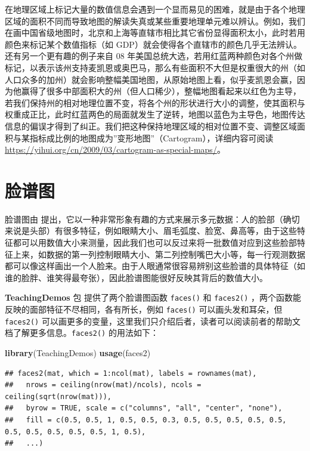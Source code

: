 \documentclass[
  b5paper,
  UTF8,twoside]{book}
\newenvironment{Shaded}{\begin{snugshade}}{\end{snugshade}}
\newcommand{\FunctionTok}[1]{\textcolor[rgb]{0.13,0.29,0.53}{\textbf{#1}}}
\newcommand{\NormalTok}[1]{#1}
\newcounter{none} %
\begin{document}
在地理区域上标记大量的数值信息会遇到一个显而易见的困难，就是由于各个地理区域的面积不同而导致地图的解读失真或某些重要地理单元难以辨认。例如，我们在画中国省级地图时，北京和上海等直辖市相比其它省份显得面积太小，此时若用颜色来标记某个数值指标（如 GDP）就会使得各个直辖市的颜色几乎无法辨认。还有另一个更有趣的例子来自 08 年美国总统大选，若用红蓝两种颜色对各个州做标记，以表示该州支持麦凯恩或奥巴马，那么有些面积不大但是权重很大的州（如人口众多的加州）就会影响整幅美国地图，从原始地图上看，似乎麦凯恩会赢，因为他赢得了很多中部面积大的州（但人口稀少），整幅地图看起来以红色为主导，若我们保持州的相对地理位置不变，将各个州的形状进行大小的调整，使其面积与权重成正比，此时红蓝两色的局面就发生了逆转，地图以蓝色为主导色，地图传达信息的偏误才得到了纠正。我们把这种保持地理区域的相对位置不变、调整区域面积与某指标成比例的地图成为''变形地图''（Cartogram），详细内容可阅读 \url{https://yihui.org/cn/2009/03/cartogram-as-special-maps/}。

\section{脸谱图}\label{sec:faces}

脸谱图由 \citet{Chernoff73} 提出，它以一种非常形象有趣的方式来展示多元数据：人的脸部（确切来说是头部）有很多特征，例如眼睛大小、眉毛弧度、脸宽、鼻高等，由于这些特征都可以用数值大小来测量，因此我们也可以反过来将一批数值对应到这些脸部特征上来，如数据的第一列控制眼睛大小、第二列控制嘴巴大小等，每一行观测数据都可以像这样画出一个人脸来。由于人眼通常很容易辨别这些脸谱的具体特征（如谁的脸胖、谁笑得最夸张），因此脸谱图能很好反映其背后的数值大小。

\textbf{TeachingDemos} 包 \citep{TeachingDemos} 提供了两个脸谱图函数 \texttt{faces()} 和 \texttt{faces2()} ，两个函数能反映的面部特征不尽相同，各有所长，例如 \texttt{faces()} 可以画头发和耳朵，但 \texttt{faces2()} 可以画更多的变量，这里我们只介绍后者，读者可以阅读前者的帮助文档了解更多信息。\texttt{faces2()} 的用法如下：

\begin{Shaded}
\begin{Highlighting}[]
\FunctionTok{library}\NormalTok{(TeachingDemos)}
\FunctionTok{usage}\NormalTok{(faces2)}
\end{Highlighting}
\end{Shaded}

\begin{verbatim}
## faces2(mat, which = 1:ncol(mat), labels = rownames(mat),
##   nrows = ceiling(nrow(mat)/ncols), ncols = ceiling(sqrt(nrow(mat))),
##   byrow = TRUE, scale = c("columns", "all", "center", "none"),
##   fill = c(0.5, 0.5, 1, 0.5, 0.5, 0.3, 0.5, 0.5, 0.5, 0.5, 0.5, 0.5, 0.5, 0.5, 0.5, 0.5, 1, 0.5),
##   ...)
\end{verbatim}
\end{document}
